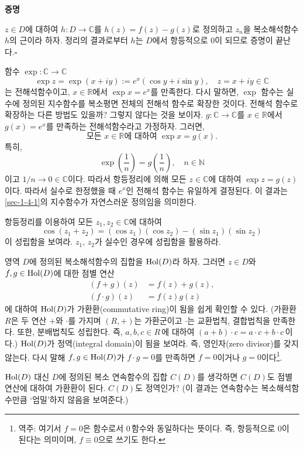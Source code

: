 {\bf 증명}

$z\in D$에 대하여
$h:D\to\mathbb C$를 $h(z) = f(z) - g(z)$로 정의하고
$z_n$을 복소해석함수 $h$의 근이라 하자.
정리의 결과로부터 $h$는 $D$에서 항등적으로 $0$이 되므로 증명이 끝난다.\hfill $\square$

\label{ex-page-4-8}
\begin{saltexample}[label=example-4-8]{}{}
함수 $\exp:\mathbb C \to \mathbb C$
\[
\exp z = \exp(x+iy) := e^x (\cos y + i\sin y), \quad
z = x+iy\in \mathbb C
\]
는  전해석함수이고, $x\in \mathbb R$에서 $\exp x = e^x$를 만족한다.
다시 말하면, $\exp$ 함수는 실수에 정의된 지수함수를 복소평면 전체의 전해석 함수로 확장한 것이다.
전해석 함수로 확장하는 다른 방법도 있을까? 그렇지 않다는 것을 보이자.
$g:\mathbb C \to \mathbb C$를  $x\in \mathbb R$에서 $g(x)=e^x$를 만족하는
전해석함수라고 가정하자.
그러면,
\[
\text{모든 } x\in \mathbb R \text{에 대하여 } \exp x = g(x).
\]
특히, 
\[
\exp\left(\dfrac1n\right)=  g\left(\dfrac1n\right), \quad n\in\mathbb N
\]
이고 $1/n \to 0\in \mathbb C$이다.
따라서 항등정리에 의해  모든 $z\in \mathbb C$에 대하여 $\exp z = g(z)$이다.
따라서 실수로 한정했을 때 $e^x$인 전해석 함수는 유일하게 결정된다.
이 결과는 \ref{sec-1-4-1}의 지수함수가 자연스러운 정의임을 의미한다. 
\end{saltexample}

\begin{salt_exercise} \label{ex-4-22}
항등정리를 이용하여 모든 $z_1, z_2 \in \mathbb C$에 대하여
\[
\cos(z_1 + z_2) = (\cos z_1)(\cos z_2) - (\sin z_1)(\sin z_2)
\]
이 성립함을 보여라.
$z_1$, $z_2$가 실수인 경우에 성립함을 활용하라.
\end{salt_exercise}

\begin{salt_exercise} \label{ex-4-23}
영역  $D$에 정의된 복소해석함수의 집합을 $\mathop{\mathrm{Hol}}(D)$라 하자.
그러면 $z\in D$와 $f,g\in \mathop{\mathrm{Hol}}(D)$에 대한 점별 연산
\begin{align*}
(f+g)(z) &=f(z)+g(z), \\
(f\cdot g)(z) &=f(z)g(z)
\end{align*}
에 대하여 $\mathop{\mathrm{Hol}}(D)$가 가환환(commutative ring)이 됨을 쉽게 확인할 수 있다.
(가환환 $R$은 두 연산 $+$와 $\cdot$를 가지며
$(R,+)$는 가환군이고 $\cdot$는 교환법칙, 결합법칙을 만족한다.
또한, 분배법칙도 성립한다. 즉, $a,b,c\in R$\,에 대하여 $(a+b)\cdot c = a\cdot c + b\cdot c$\,이다.)
$\mathop{\mathrm{Hol}}(D)$가 정역(integral domain)이 됨을 보여라.
즉, 영인자(zero divisor)를 갖지 않는다. 다시 말해 $f,g\in \mathop{\mathrm{Hol}}(D)$가 $f\cdot g=0$를
만족하면 $f=0$이거나 $g=0$이다\footnote{
역주: 여기서 $f=0$은 함수로서 $0$\,함수와 동일하다는 뜻이다.
즉, 항등적으로 $0$이 된다는 의미이며, $f\equiv 0$으로 쓰기도 한다.
}.

$\mathop{\mathrm{Hol}}(D)$ 대신 $D$에 정의된 복소 연속함수의 집합 $C(D)$를 생각하면
$C(D)$도 점별 연산에 대하여 가환환이 된다.
$C(D)$도 정역인가?
(이 결과는 연속함수는 복소해석함수만큼 `엄밀'하지 않음을 보여준다.)
\end{salt_exercise}

